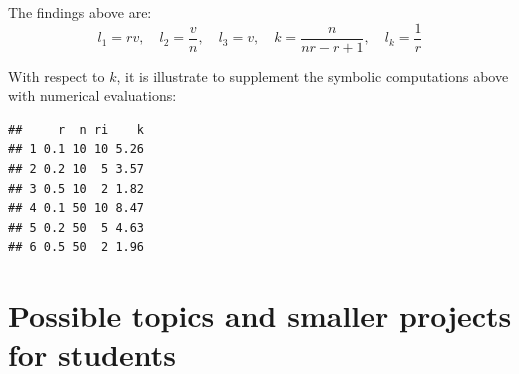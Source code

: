 \documentclass[10pt,]{article}
\newenvironment{Shaded}{\begin{snugshade}}{\end{snugshade}}
\newcommand{\DataTypeTok}[1]{\textcolor[rgb]{0.13,0.29,0.53}{#1}}
\newcommand{\DecValTok}[1]{\textcolor[rgb]{0.00,0.00,0.81}{#1}}
\newcommand{\KeywordTok}[1]{\textcolor[rgb]{0.13,0.29,0.53}{\textbf{#1}}}
\newcommand{\NormalTok}[1]{#1}
\newcommand{\OperatorTok}[1]{\textcolor[rgb]{0.81,0.36,0.00}{\textbf{#1}}}
\newcommand{\StringTok}[1]{\textcolor[rgb]{0.31,0.60,0.02}{#1}}
\begin{document}
The findings above are: \[
l_1 = r v, \quad
l_2 = \frac{v}{n}, \quad
l_3 = v, \quad
k = \frac{n}{n r - r + 1}, \quad 
l_k = \frac{1}{r}
\]

With respect to \(k\), it is illustrate to supplement the symbolic
computations above with numerical evaluations:

\begin{Shaded}
\end{Shaded}

\begin{verbatim}
##     r  n ri    k
## 1 0.1 10 10 5.26
## 2 0.2 10  5 3.57
## 3 0.5 10  2 1.82
## 4 0.1 50 10 8.47
## 5 0.2 50  5 4.63
## 6 0.5 50  2 1.96
\end{verbatim}

\hypertarget{sec:topicsstudents}{%
\section{Possible topics and smaller projects for
students}\label{sec:topicsstudents}}
\end{document}
